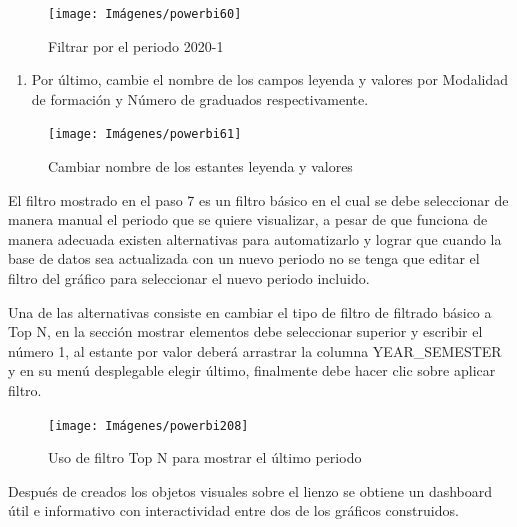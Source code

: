 \documentclass[
]{book}
\providecommand{\tightlist}{%
  \setlength{\itemsep}{0pt}\setlength{\parskip}{0pt}}
\begin{document}
\begin{figure}

{\centering \texttt{[image: Imágenes/powerbi60]} 

}

\caption{Filtrar por el periodo 2020-1}\label{fig:paso7circular-fig}
\end{figure}

\begin{enumerate}
\def\labelenumi{\arabic{enumi}.}
\setcounter{enumi}{7}
\tightlist
\item
  Por último, cambie el nombre de los campos leyenda y valores por Modalidad de formación y Número de graduados respectivamente.
\end{enumerate}

\begin{figure}

{\centering \texttt{[image: Imágenes/powerbi61]} 

}

\caption{Cambiar nombre de los estantes leyenda y valores}\label{fig:paso8circular-fig}
\end{figure}

El filtro mostrado en el paso 7 es un filtro básico en el cual se debe seleccionar de manera manual el periodo que se quiere visualizar, a pesar de que funciona de manera adecuada existen alternativas para automatizarlo y lograr que cuando la base de datos sea actualizada con un nuevo periodo no se tenga que editar el filtro del gráfico para seleccionar el nuevo periodo incluido.

Una de las alternativas consiste en cambiar el tipo de filtro de filtrado básico a Top N, en la sección mostrar elementos debe seleccionar superior y escribir el número 1, al estante por valor deberá arrastrar la columna YEAR\_SEMESTER y en su menú desplegable elegir último, finalmente debe hacer clic sobre aplicar filtro.

\begin{figure}

{\centering \texttt{[image: Imágenes/powerbi208]} 

}

\caption{Uso de filtro Top N para mostrar el último periodo}\label{fig:filtrotopngraficocircular-fig}
\end{figure}

Después de creados los objetos visuales sobre el lienzo se obtiene un dashboard útil e informativo con interactividad entre dos de los gráficos construidos.
\end{document}
